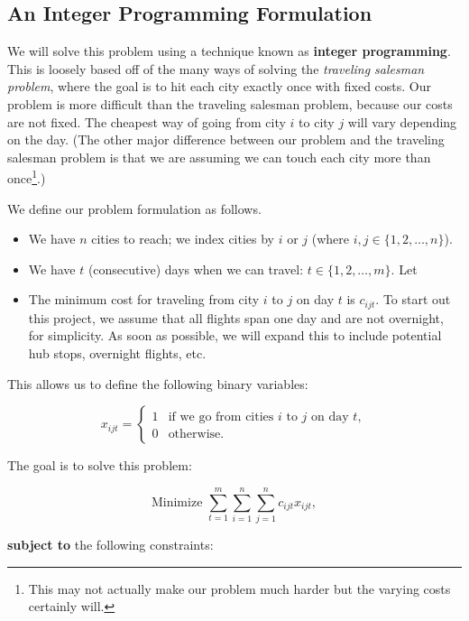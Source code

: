 \documentclass{article}
\begin{document}
\subsection{An Integer Programming Formulation}

We will solve this problem using a technique known as \textbf{integer programming}. This is loosely based off of the many ways of solving the
\emph{traveling salesman problem}, where the goal is to hit each city exactly once with fixed costs. Our problem is more difficult than the traveling
salesman problem, because our costs are not fixed. The cheapest way of going from city $i$ to city $j$ will vary depending on the day. (The other
major difference between our problem and the traveling salesman problem is that we are assuming we can touch each city more than once\footnote{This
may not actually make our problem much harder but the varying costs certainly will.}.)

We define our problem formulation as follows.

\begin{itemize}
    \item We have $n$ cities to reach; we index cities by $i$ or $j$ (where $i, j \in \{1, 2, \ldots, n\}$).
    \item We have $t$ (consecutive) days when we can travel: $t \in \{1, 2, \ldots, m\}$. Let
    \item The minimum cost for traveling from city $i$ to $j$ on day $t$ is $c_{ijt}$. To start out this project, we assume that all flights span one
day and are not overnight, for simplicity. As soon as possible, we will expand this to include potential hub stops, overnight flights, etc.
\end{itemize}

This allows us to define the following binary variables:

\[
x_{ijt} = \begin{cases}
1 &\mbox{if we go from cities } i \mbox{ to } j \mbox{ on day } t, \\ 
0 & \mbox{otherwise}.
\end{cases}
\]

The goal is to solve this problem:

\begin{equation}
\mbox{Minimize } \sum_{t=1}^{m} \sum_{i=1}^{n} \sum_{j=1}^{n} c_{ijt}x_{ijt},
\end{equation}

\textbf{subject to} the following constraints:
\end{document}
